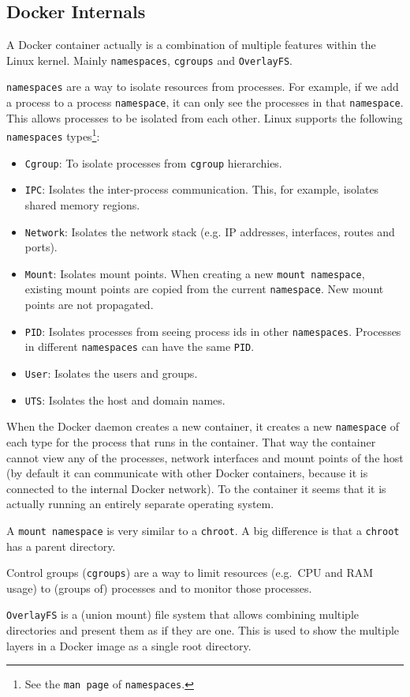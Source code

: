 \subsection{Docker Internals}\label{subsubsection:internals}
A Docker container actually is a combination of multiple features within the Linux kernel.
Mainly \lstinline{namespaces}, \lstinline{cgroups} and \lstinline{OverlayFS}.

\medskip

\lstinline{namespaces} are a way to isolate resources from processes. For example, if we add a process to a process \lstinline{namespace}, it can only see the processes in that \lstinline{namespace}. This allows processes to be isolated from each other. Linux supports the following \lstinline{namespaces} types\footnote{See the \lstinline{man page} of \lstinline{namespaces}.}:
\begin{itemize}
    \item \lstinline{Cgroup}: To isolate processes from \lstinline{cgroup} hierarchies.
    \item \lstinline{IPC}: Isolates the inter-process communication. This, for example, isolates shared memory regions.
    \item \lstinline{Network}: Isolates the network stack (e.g. IP addresses, interfaces, routes and ports).
    \item \lstinline{Mount}: Isolates mount points. When creating a new \lstinline{mount namespace}, existing mount points are copied from the current \lstinline{namespace}. New mount points are not propagated.
    \item \lstinline{PID}: Isolates processes from seeing process ids in other \lstinline{namespaces}. Processes in different \lstinline{namespaces} can have the same \lstinline{PID}.
    \item \lstinline{User}: Isolates the users and groups.
    \item \lstinline{UTS}: Isolates the host and domain names.
\end{itemize}

When the Docker daemon creates a new container, it creates a new \lstinline{namespace} of each type for the process that runs in the container. That way the container cannot view any of the processes, network interfaces and mount points of the host (by default it can communicate with other Docker containers, because it is connected to the internal Docker network). To the container it seems that it is actually running an entirely separate operating system.

A \lstinline{mount namespace} is very similar to a \lstinline{chroot}. A big difference is that a \lstinline{chroot} has a parent directory.

\medskip

Control groups (\lstinline{cgroups}) are a way to limit resources (e.g.\ CPU and RAM usage) to (groups of) processes and to monitor those processes.

\medskip

\lstinline{OverlayFS} is a (union mount) file system that allows combining multiple directories and present them as if they are one. This is used to show the multiple layers in a Docker image as a single root directory.
